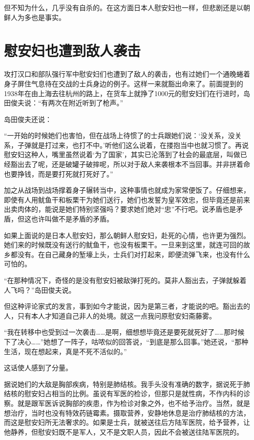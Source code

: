 \documentclass[12pt,UTF8]{ctexbook}
\begin{document}
但不知为什么，几乎没有自杀的。在这方面日本人慰安妇也一样，但悲剧还是以朝鲜人为多也是事实。

\section{慰安妇也遭到敌人袭击}

攻打汉口和部队强行军中慰安妇们也遭到了敌人的袭击，也有过她们一个通晚蜷着身子屏住气息待在交战的士兵身边的例子。这样一来就豁出命来了。前面提到的1938年在由上海去往杭州的路上，在货车上就挣了1000元的慰安妇们在行进时，岛田俊夫说：“有两次在附近听到了枪声。”

岛田俊夫还说：

“一开始的时候她们也害怕，但在战场上待惯了的士兵跟她们说：‘没关系，没关系，子弹就是打过来，也打不中。’听他们这么说着，在搂抱当中也就习惯了。再说慰安妇这种人，嘴里虽然说着‘为了国家’，其实已沦落到了社会的最底层，叫做已经豁出去了呢，还是破罐子破摔呢，所以对于敌人来袭根本不当回事。并非拼着命也要挣钱，而是要打死就打死好了。”

加之从战场到战场撑着身子辗转当中，这种事情也就成为家常便饭了。仔细想来，即使有人用鱿鱼干和板栗干为她们送行，她们也发誓为皇军效忠，但毕竟还是前来出卖肉体的，能说是她们特别坚强吗？要求她们绝对“忠”不行吧。说矛盾也是矛盾，但这也许叫做不是矛盾的矛盾。

如果上面说的是日本人慰安妇，那么朝鲜人慰安妇，赴死的心情，也许更为强烈。她们来的时候既没有送行的鱿鱼干，也没有板栗干。一旦来到这里，就连可回的故乡都没有。在自己藏身的堑壕上头，士兵们对打起来，即便流弹飞来，也没有什么可怕的。

“在那种情况下，奇怪的是没有慰安妇被敌弹打死的。莫非人豁出去，子弹就躲着人飞吗？”岛田俊夫说。

但这种评论家式的发言，事到如今才能说，因为是第三者，才能说的吧。豁出去的人，只有本人才知道自己非人的处境。就这一点我问原慰安妇斋藤雾。

“我在转移中也受到过一次袭击……是啊，细想想毕竟还是要死就死好了……那时候下了决心……”她想了一阵子，咕哝似的回答说，“到底是那么回事。”她还说，“那种生活，现在想起来，真是不死不活似的。”

这话使人感到了分量。

据说她们的大敌是胸部疾病，特别是肺结核。我手头没有准确的数字，据说死于肺结核的慰安妇占相当的比例。虽说有军医的检诊，但那只是就性病，不作内科的诊察。就是跟军医诉说胸部的疾患，作为检诊对象之外，也不给予治疗。当然，就是想治疗，当时也没有特效药链霉素。摄取营养，安静地休息是治疗肺结核的方法，而这是慰安妇所无法奢求的。如果是士兵，就被送往后方陆军医院，给予营养，让他静养，但慰安妇既不是军人，又不是文职人员，因此不会被送往陆军医院的。
\end{document}
